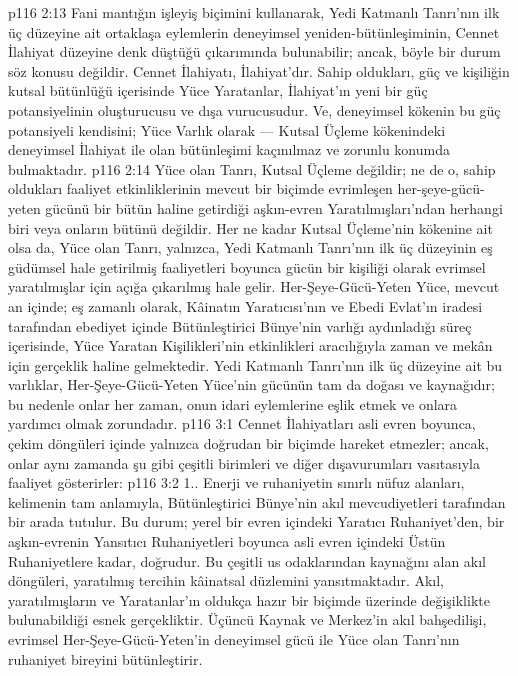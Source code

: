 \vs p116 2:13 Fani mantığın işleyiş biçimini kullanarak, Yedi Katmanlı Tanrı’nın ilk üç düzeyine ait ortaklaşa eylemlerin deneyimsel yeniden\hyp{}bütünleşiminin, Cennet İlahiyat düzeyine denk düştüğü çıkarımında bulunabilir; ancak, böyle bir durum söz konusu değildir. Cennet İlahiyatı,  İlahiyat’dır. Sahip oldukları, güç ve kişiliğin kutsal bütünlüğü içerisinde Yüce Yaratanlar,  İlahiyat’ın yeni bir güç potansiyelinin oluşturucusu ve dışa vurucusudur. Ve, deneyimsel kökenin bu güç potansiyeli kendisini; Yüce Varlık olarak --- Kutsal Üçleme kökenindeki deneyimsel İlahiyat ile olan bütünleşimi kaçınılmaz ve zorunlu konumda bulmaktadır.
\vs p116 2:14 Yüce olan Tanrı, Kutsal Üçleme değildir; ne de o, sahip oldukları faaliyet etkinliklerinin mevcut bir biçimde evrimleşen her\hyp{}şeye\hyp{}gücü\hyp{}yeten gücünü bir bütün haline getirdiği aşkın\hyp{}evren Yaratılmışları’ndan herhangi biri veya onların bütünü değildir. Her ne kadar Kutsal Üçleme’nin kökenine ait olsa da, Yüce olan Tanrı, yalnızca, Yedi Katmanlı Tanrı’nın ilk üç düzeyinin eş güdümsel hale getirilmiş faaliyetleri boyunca gücün bir kişiliği olarak evrimsel yaratılmışlar için açığa çıkarılmış hale gelir. Her\hyp{}Şeye\hyp{}Gücü\hyp{}Yeten Yüce, mevcut an içinde; eş zamanlı olarak, Kâinatın Yaratıcısı’nın ve Ebedi Evlat’ın iradesi tarafından ebediyet içinde Bütünleştirici Bünye’nin varlığı aydınladığı süreç içerisinde, Yüce Yaratan Kişilikleri’nin etkinlikleri aracılığıyla zaman ve mekân için gerçeklik haline gelmektedir. Yedi Katmanlı Tanrı’nın ilk üç düzeyine ait bu varlıklar, Her\hyp{}Şeye\hyp{}Gücü\hyp{}Yeten Yüce’nin gücünün tam da doğası ve kaynağıdır; bu nedenle onlar her zaman, onun idari eylemlerine eşlik etmek ve onlara yardımcı olmak zorundadır.
\vs p116 3:1 Cennet İlahiyatları asli evren boyunca, çekim döngüleri içinde yalnızca doğrudan bir biçimde hareket etmezler; ancak, onlar aynı zamanda şu gibi çeşitli birimleri ve diğer dışavurumları vasıtasıyla faaliyet gösterirler:
\vs p116 3:2 1.\bibnobreakspace {}. Enerji ve ruhaniyetin sınırlı nüfuz alanları, kelimenin tam anlamıyla, Bütünleştirici Bünye’nin akıl mevcudiyetleri tarafından bir arada tutulur. Bu durum; yerel bir evren içindeki Yaratıcı Ruhaniyet’den, bir aşkın\hyp{}evrenin Yansıtıcı Ruhaniyetleri boyunca asli evren içindeki Üstün Ruhaniyetlere kadar, doğrudur. Bu çeşitli us odaklarından kaynağını alan akıl döngüleri, yaratılmış tercihin kâinatsal düzlemini yansıtmaktadır. Akıl, yaratılmışların ve Yaratanlar’ın oldukça hazır bir biçimde üzerinde değişiklikte bulunabildiği esnek gerçekliktir. Üçüncü Kaynak ve Merkez’in akıl bahşedilişi, evrimsel Her\hyp{}Şeye\hyp{}Gücü\hyp{}Yeten’in deneyimsel gücü ile Yüce olan Tanrı’nın ruhaniyet bireyini bütünleştirir.

